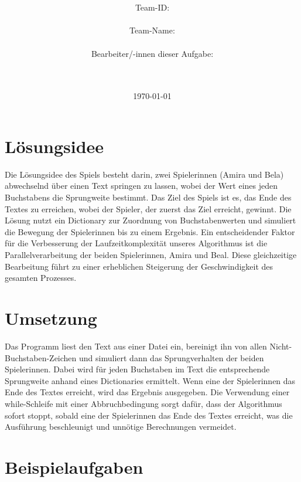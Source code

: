 \documentclass[a4paper,10pt,ngerman]{scrartcl}
\title{\textbf{\Huge\Aufgabe}}
\author{\LARGE Team-ID: \LARGE \TeamId \\\\
	\LARGE Team-Name: \LARGE \TeamName \\\\
	\LARGE Bearbeiter/-innen dieser Aufgabe: \\ 
	\LARGE \Namen\\\\}
\date{\LARGE\today}
\begin{document}
	
	\maketitle
	\tableofcontents
	
	\vspace{0.5cm}
	
	\section{Lösungsidee}
	Die Lösungsidee des Spiels besteht darin, zwei Spielerinnen (Amira und Bela) abwechselnd über einen Text springen zu lassen, wobei der Wert eines jeden Buchstabens die Sprungweite bestimmt. Das Ziel des Spiels ist es, das Ende des Textes zu erreichen, wobei der Spieler, der zuerst das Ziel erreicht, gewinnt. Die Lösung nutzt ein Dictionary zur Zuordnung von Buchstabenwerten und simuliert die Bewegung der Spielerinnen bis zu einem Ergebnis. Ein entscheidender Faktor für die Verbesserung der Laufzeitkomplexität unseres Algorithmus ist die Parallelverarbeitung der beiden Spielerinnen, Amira und Beal. Diese gleichzeitige Bearbeitung führt zu einer erheblichen Steigerung der Geschwindigkeit des gesamten Prozesses.
	
	\section{Umsetzung}
	Das Programm liest den Text aus einer Datei ein, bereinigt ihn von allen Nicht-Buchstaben-Zeichen und simuliert dann das Sprungverhalten der beiden Spielerinnen. Dabei wird für jeden Buchstaben im Text die entsprechende Sprungweite anhand eines Dictionaries ermittelt. Wenn eine der Spielerinnen das Ende des Textes erreicht, wird das Ergebnis ausgegeben. Die Verwendung einer while-Schleife mit einer Abbruchbedingung sorgt dafür, dass der Algorithmus sofort stoppt, sobald eine der Spielerinnen das Ende des Textes erreicht, was die Ausführung beschleunigt und unnötige Berechnungen vermeidet.
	
	
	\section{Beispielaufgaben}
	
\end{document}
